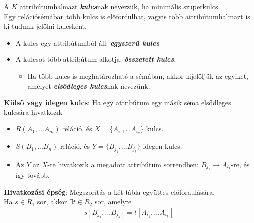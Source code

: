 \documentclass[tikz,12pt,margin=0px]{article}
\begin{document}
    \noindent A $K$ attribútumhalmazt \emph{\textbf{kulcs}}nak nevezzük, ha minimális szuperkulcs.\\

    \noindent Egy relációsémában több kulcs is előfordulhat, vagyis több attribútumhalmazt is ki tudunk jelölni kulcsként.

    \begin{itemize}
        \item A kulcs egy attribútumból áll: \textbf{\emph{egyszerű kulcs}}
        \item A kulcsot több attribútum alkotja: \textbf{\emph{összetett kulcs}}.
        \begin{itemize}
            \item Ha több kulcs is meghatározható a sémában, akkor kijelöljük az egyiket, amelyet \textbf{\emph{elsődleges kulcs}}nak nevezünk.
        \end{itemize}
    \end{itemize}
\newpage
    \noindent \textbf{Külső vagy idegen kulcs}: Ha egy attribútum egy másik séma elsődleges kulcsára hivatkozik.
        \begin{itemize}
            \item $R(A_1,...A_m)$ reláció, és $X=\{A_{i_1},...A_{i_k}\}$ kulcs.
            \item $S(B_1,...B_n)$ reláció, és $Y=\{B_{j_1},...B_{j_k}\}$ idegen kulcs.
            \item Az $Y$ az $X$-re hivatkozik a megadott attribútum sorrendben: $B_{j_1} \to A_{i_1}$-re, és így tovább.\\
        \end{itemize}

	\noindent \textbf{Hivatkozási épség}: Megszorítás a két tábla együttes előfordulására.\\
    Ha $s \in R_1$ sor, akkor $\exists t \in R_2$ sor, amelyre
    \[
        s[B_{j_1},...B_{j_k}] = t[A_{i_1},...A_{i_k}]
    \]
\end{document}
